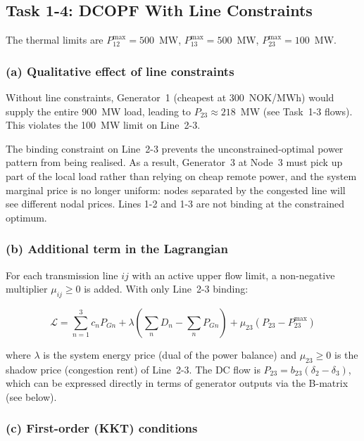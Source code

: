 \subsection{Task 1-4: DCOPF With Line Constraints}

The thermal limits are
$P_{12}^{\max} = 500$~MW, $P_{13}^{\max} = 500$~MW,
$P_{23}^{\max} = 100$~MW.

\subsubsection*{(a) Qualitative effect of line constraints}

Without line constraints, Generator~1 (cheapest at 300~NOK/MWh) would supply
the entire 900~MW load, leading to $P_{23} \approx 218$~MW
(see Task~1-3 flows).  This violates the 100~MW limit on Line~2-3.

The binding constraint on Line~2-3 prevents the unconstrained-optimal
power pattern from being realised.  As a result, Generator~3 at Node~3 must
pick up part of the local load rather than relying on cheap remote power, and
the system marginal price is no longer uniform: nodes separated by the
congested line will see different nodal prices.  Lines 1-2 and 1-3 are not
binding at the constrained optimum.

\subsubsection*{(b) Additional term in the Lagrangian}

For each transmission line $ij$ with an active upper flow limit, a
non-negative multiplier $\mu_{ij} \geq 0$ is added.  With only Line~2-3
binding:

\[
  \mathcal{L} = \sum_{n=1}^{3} c_n P_{Gn}
              + \lambda\!\left(\sum_{n} D_n - \sum_{n} P_{Gn}\right)
              + \mu_{23}\!\left(P_{23} - P_{23}^{\max}\right)
\]

where $\lambda$ is the system energy price (dual of the power balance) and
$\mu_{23} \geq 0$ is the shadow price (congestion rent) of Line~2-3.
The DC flow is $P_{23} = b_{23}(\delta_2 - \delta_3)$, which can be
expressed directly in terms of generator outputs via the B-matrix
(see below).

\subsubsection*{(c) First-order (KKT) conditions}


